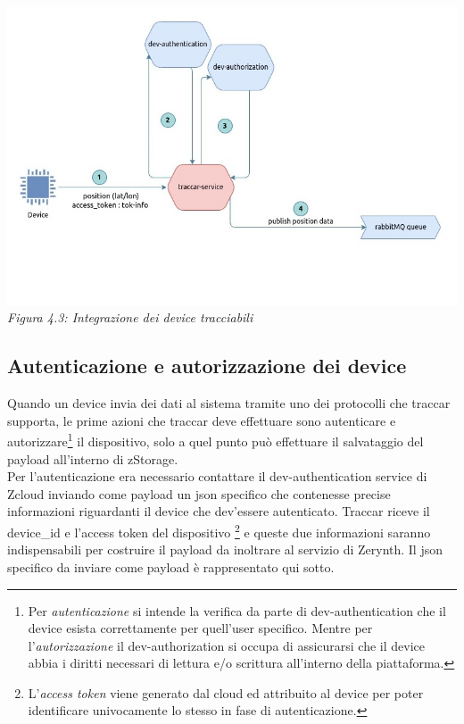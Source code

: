 \documentclass[a4paper,titlepage,12pt]{book}
\begin{document}
\begin{center}
\centering
\includegraphics[scale=0.6]{images/dev-aut-traccar.jpg}\\ 
\textit{Figura 4.3: Integrazione dei device tracciabili}
\end{center}

\subsection{\sffamily
Autenticazione e autorizzazione dei device}
Quando un device invia dei dati al sistema tramite uno dei protocolli che traccar supporta, le prime azioni che traccar deve effettuare sono autenticare e autorizzare\footnote{\sffamily
Per \textit{autenticazione} si intende la verifica da parte di dev-authentication che il device esista correttamente per quell'user specifico. Mentre per l'\textit{autorizzazione} il dev-authorization si occupa di assicurarsi che il device abbia i diritti necessari di lettura e/o scrittura all'interno della piattaforma.} il dispositivo, solo a quel punto può effettuare il salvataggio del payload all'interno di zStorage.\\
Per l'autenticazione era necessario contattare il dev-authentication service di Zcloud inviando come payload un json specifico che contenesse precise informazioni riguardanti il device che dev'essere autenticato. Traccar riceve il device\_id e l'access token del dispositivo \footnote{\sffamily
L'\textit{access token} viene generato dal cloud ed attribuito al device per poter identificare univocamente lo stesso in fase di autenticazione.} e queste due informazioni saranno indispensabili per costruire il payload da inoltrare al servizio di Zerynth. Il json specifico da inviare come payload è rappresentato qui sotto.
\pagebreak
\end{document}
